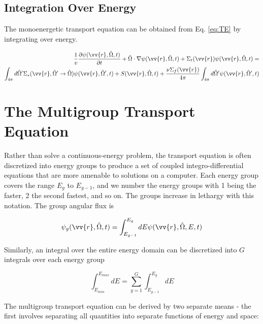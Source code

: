 \documentclass[10pt]{article}
\newcommand{\hO}{\hat{\Omega}}
\begin{document}
\begin{flushleft}
\subsection{Integration Over Energy}

The monoenergetic transport equation can be obtained from Eq. \eqref{eq:TE} by integrating over energy. 

\begin{equation}
\label{eq:TEMonoenergetic}
\begin{aligned}
\frac{1}{v} \frac{\partial\psi(\vv{r},\hO  ,t)}{\partial t} +
 \hO  \cdot\nabla\psi(\vv{r}, \hO  ,t) + 
 \Sigma_t(\vv{r})\psi(\vv{r}, \hO  ,t) = \\
\int_{4\pi}^{ } d\hO  ' \Sigma_s(\vv{r}, \hO  '\rightarrow\hO  )\psi(\vv{r}, \hO  ',t) + S(\vv{r}, \hO  ,t)+\frac{\nu\Sigma_f(\vv{r})}{4\pi} \int_{4\pi}^{} d\hO  '\psi(\vv{r},\hO  ',t)\\
\end{aligned}
\end{equation}

\clearpage
\section{The Multigroup Transport Equation}

Rather than solve a continuous-energy problem, the transport equation is often discretized into energy groups to produce a set of coupled integro-differential equations that are more amenable to solutions on a computer. Each energy group covers the range \(E_g\) to \(E_{g-1}\), and we number the energy groups with 1 being the faster, 2 the second fastest, and so on. The groups increase in lethargy with this notation. The group angular flux is

\begin{equation}
\label{eq:GrpAngularFlux}
\psi_g (\vv{r}, \hO  ,t) = \int_{E_{g-1}}^{E_g} dE \psi(\vv{r}, \hO  ,E, t)
\end{equation}

Similarly, an integral over the entire energy domain can be discretized into \(G\) integrals over each energy group

\begin{equation}
\label{eq:dEMultiGroup}
\int_{E_{min}}^{E_{max}}dE = \sum_{g=1}^{G} \int_{E_{g-1}}^{E_g} dE
\end{equation}

The multigroup transport equation can be derived by two separate means - the first involves separating all quantities into separate functions of energy and space:


\end{flushleft}
\end{document}
